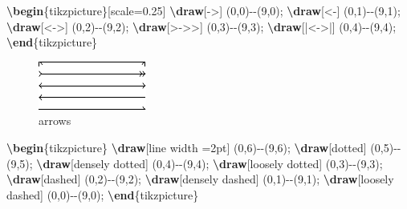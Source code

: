 \documentclass[
]{book}
\newenvironment{Shaded}{\begin{snugshade}}{\end{snugshade}}
\newcommand{\ExtensionTok}[1]{#1}
\newcommand{\FunctionTok}[1]{\textcolor[rgb]{0.13,0.29,0.53}{\textbf{#1}}}
\newcommand{\KeywordTok}[1]{\textcolor[rgb]{0.13,0.29,0.53}{\textbf{#1}}}
\newcommand{\NormalTok}[1]{#1}
\theoremstyle{definition}
\theoremstyle{definition}
\theoremstyle{definition}
\theoremstyle{definition}
\theoremstyle{remark}
\begin{document}
\begin{Shaded}
\begin{Highlighting}[]
\KeywordTok{\textbackslash{}begin}\NormalTok{\{}\ExtensionTok{tikzpicture}\NormalTok{\}[scale=0.25]}
  \FunctionTok{\textbackslash{}draw}\NormalTok{[{-}\textgreater{}] (0,0){-}{-}(9,0);}
  \FunctionTok{\textbackslash{}draw}\NormalTok{[\textless{}{-}] (0,1){-}{-}(9,1);}
  \FunctionTok{\textbackslash{}draw}\NormalTok{[\textless{}{-}\textgreater{}] (0,2){-}{-}(9,2);}
  \FunctionTok{\textbackslash{}draw}\NormalTok{[\textgreater{}{-}\textgreater{}\textgreater{}] (0,3){-}{-}(9,3);}
  \FunctionTok{\textbackslash{}draw}\NormalTok{[|\textless{}{-}\textgreater{}|] (0,4){-}{-}(9,4);}
\KeywordTok{\textbackslash{}end}\NormalTok{\{}\ExtensionTok{tikzpicture}\NormalTok{\}}
\end{Highlighting}
\end{Shaded}

\begin{figure}
\includegraphics[width=0.75\linewidth]{202401311000-TikZ_files/figure-latex/unnamed-chunk-37-1} \caption{arrows}\label{fig:unnamed-chunk-37}
\end{figure}

\begin{Shaded}
\begin{Highlighting}[]
\KeywordTok{\textbackslash{}begin}\NormalTok{\{}\ExtensionTok{tikzpicture}\NormalTok{\}}
  \FunctionTok{\textbackslash{}draw}\NormalTok{[line width =2pt] (0,6){-}{-}(9,6); }
  \FunctionTok{\textbackslash{}draw}\NormalTok{[dotted]          (0,5){-}{-}(9,5); }
  \FunctionTok{\textbackslash{}draw}\NormalTok{[densely dotted]  (0,4){-}{-}(9,4); }
  \FunctionTok{\textbackslash{}draw}\NormalTok{[loosely dotted]  (0,3){-}{-}(9,3); }
  \FunctionTok{\textbackslash{}draw}\NormalTok{[dashed]          (0,2){-}{-}(9,2); }
  \FunctionTok{\textbackslash{}draw}\NormalTok{[densely dashed]  (0,1){-}{-}(9,1); }
  \FunctionTok{\textbackslash{}draw}\NormalTok{[loosely dashed]  (0,0){-}{-}(9,0);}
\KeywordTok{\textbackslash{}end}\NormalTok{\{}\ExtensionTok{tikzpicture}\NormalTok{\}}
\end{Highlighting}
\end{Shaded}
\end{document}
